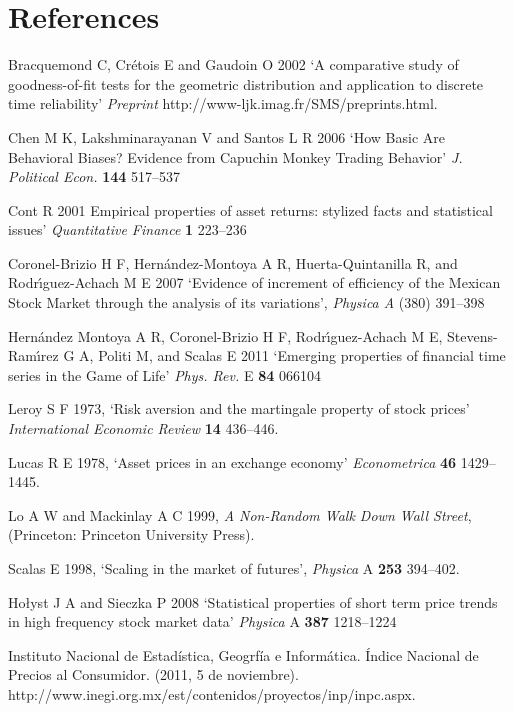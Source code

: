 \documentclass[a4paper]{jpconf}
\begin{document}
\section*{References}
\begin{thebibliography}{15}

Bracquemond C, Cr\'etois E and Gaudoin O 2002 `A comparative study of goodness-of-fit tests for the geometric distribution and application to discrete time reliability' {\it Preprint} http://www-ljk.imag.fr/SMS/preprints.html.

Chen M K, Lakshminarayanan V and Santos L R 2006 `How Basic Are Behavioral Biases? Evidence from Capuchin Monkey Trading Behavior' {\it J. Political Econ.} {\bf 144} 517--537

Cont R 2001 Empirical properties of asset returns: stylized facts and statistical issues' {\it Quantitative Finance} {\bf 1} 223--236

Coronel-Brizio H F, Hern\'andez-Montoya A R, Huerta-Quintanilla R, and Rodr\'{\i}guez-Achach M E 2007 `Evidence of increment of efficiency of the Mexican Stock Market through the analysis of its variations', \textit{Physica A} (380) 391–398

Hern\'andez Montoya A R, Coronel-Brizio H F, Rodr\'{\i}guez-Achach M E, Stevens-Ram\'{\i}rez G A, Politi M, and Scalas E 2011 `Emerging properties of financial time series in the Game of Life' {\it Phys. Rev.} E {\bf 84} 066104

Leroy S F 1973, `Risk aversion and the martingale property of stock prices' {\it International Economic Review} {\bf 14} 436--446.

 Lucas R E 1978, `Asset prices in an exchange economy'  {\it Econometrica} {\bf 46} 1429--1445.

Lo A W and Mackinlay A C 1999, {\it A Non-Random Walk Down Wall Street}, (Princeton: Princeton University Press).

 Scalas E 1998, `Scaling in the market of futures', {\it Physica} A {\bf 253} 394--402.

Ho\l{yst} J A and Sieczka P 2008 `Statistical properties of short term price trends in high frequency stock market data' {\it Physica} A {\bf 387} 1218--1224

Instituto Nacional de Estad\'istica, Geogrf\'ia e Inform\'atica. \'Indice Nacional de Precios al Consumidor. (2011, 5 de noviembre). http://www.inegi.org.mx/est/contenidos/proyectos/inp/inpc.aspx.


\end{thebibliography}
\end{document}
